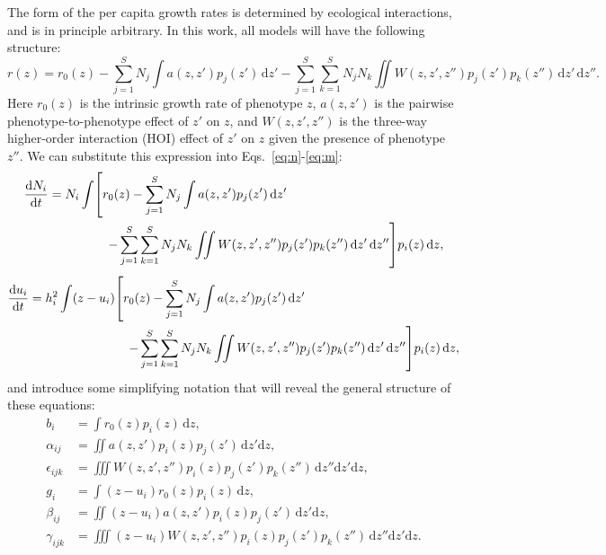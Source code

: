 \documentclass[10pt]{article}
\newcommand{\ud}{\text{d}}
\let\originalleft\left
\let\originalright\right
\renewcommand{\left}{\mathopen{}\mathclose\bgroup\originalleft}
\renewcommand{\right}{\aftergroup\egroup\originalright}
\begin{document}
The form of the per capita growth rates is determined by ecological interactions, and is in principle arbitrary. In this work, all models will have the following structure:
\begin{equation}
  \label{eq:pgr_general}
  r(z) = r_0(z) - \sum_{j=1}^S N_j \int a(z,z') p_j(z') \,\ud z' - \sum_{j=1}^S \sum_{k=1}^S N_j N_k
  \iint W(z,z',z'') p_j(z') p_k(z'') \,\ud z' \,\ud z'' .
\end{equation}
Here $r_0(z)$ is the intrinsic growth rate of phenotype $z$, $a(z,z')$ is the pairwise phenotype-to-phenotype effect of $z'$ on $z$, and $W(z,z',z'')$ is the three-way higher-order interaction (HOI) effect of $z'$ on $z$ given the presence of phenotype $z''$. We can substitute this expression into Eqs.~\ref{eq:n}-\ref{eq:m}:
\begin{equation}
  \label{eq:n_spplevel}
  \begin{split}
  \frac{\ud N_i}{\ud t}
  = N_i \int &\left[ r_0(z)
  - \sum_{j=1}^S N_j \int a(z,z') p_j(z') \,\ud z' \right.
  \\ &\quad \left.
  - \sum_{j=1}^S \sum_{k=1}^S N_j N_k
  \iint W(z,z',z'') p_j(z') p_k(z'') \,\ud z' \,\ud z'' \right]
  p_i(z) \,\ud z ,
  \end{split}
\end{equation}
\begin{equation}
  \label{eq:m_spplevel}
  \begin{split}
  \frac{\ud u_i}{\ud t}
  = h_i^2 \int (z - u_i) &\left[ r_0(z)
  - \sum_{j=1}^S N_j \int a(z,z') p_j(z') \,\ud z' \right.
  \\ &\quad \left.
  - \sum_{j=1}^S \sum_{k=1}^S N_j N_k
  \iint W(z,z',z'') p_j(z') p_k(z'') \,\ud z' \,\ud z'' \right]
  p_i(z) \,\ud z ,
  \end{split}
\end{equation}
and introduce some simplifying notation that will reveal the general structure of these equations:
\begin{align}
  \label{eq:b_general}
  b_i
  &= \int r_0(z) p_i(z) \,\ud z ,
  \\
  \label{eq:alpha_general}
  \alpha_{ij}
  &= \iint a(z,z') p_i(z) p_j(z') \,\ud z' \ud z ,
  \\
  \label{eq:epsilon_general}
  \epsilon_{ijk}
  &= \iiint W(z,z',z'') p_i(z) p_j(z') p_k(z'') \,\ud z'' \ud z' \ud z ,
  \\
  \label{eq:g_general}
  g_i
  &= \int (z-u_i) r_0(z) p_i(z) \,\ud z ,
  \\
  \label{eq:beta_general}
  \beta_{ij}
  &= \iint (z-u_i) a(z,z') p_i(z) p_j(z') \,\ud z' \ud z ,
  \\
  \label{eq:gamma_general}
  \gamma_{ijk}
  &= \iiint (z-u_i) W(z,z',z'') p_i(z) p_j(z') p_k(z'')\,\ud z''\ud z'\ud z .
\end{align}
\end{document}
